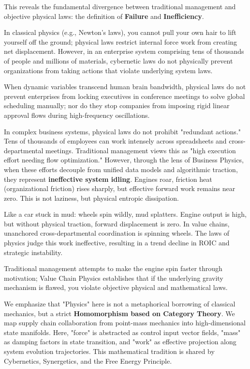 \documentclass[12pt,a4paper,oneside]{book}
\begin{document}
This reveals the fundamental divergence between traditional management and objective physical laws: the definition of \textbf{Failure} and \textbf{Inefficiency}.

In classical physics (e.g., Newton's laws), you cannot pull your own hair to lift yourself off the ground; physical laws restrict internal force work from creating net displacement. However, in an enterprise system comprising tens of thousands of people and millions of materials, cybernetic laws do not physically prevent organizations from taking actions that violate underlying system laws.

When dynamic variables transcend human brain bandwidth, physical laws do not prevent enterprises from locking executives in conference meetings to solve global scheduling manually; nor do they stop companies from imposing rigid linear approval flows during high-frequency oscillations.

In complex business systems, physical laws do not prohibit "redundant actions." Tens of thousands of employees can work intensely across spreadsheets and cross-departmental meetings. Traditional management views this as "high execution effort needing flow optimization." However, through the lens of Business Physics, when these efforts decouple from unified data models and algorithmic traction, they represent \textbf{ineffective system idling}. Engines roar, friction heat (organizational friction) rises sharply, but effective forward work remains near zero. This is not laziness, but physical entropic dissipation.

Like a car stuck in mud: wheels spin wildly, mud splatters. Engine output is high, but without physical traction, forward displacement is zero. In value chains, unanchored cross-departmental coordination is spinning wheels. The laws of physics judge this work ineffective, resulting in a trend decline in ROIC and strategic instability.

Traditional management attempts to make the engine spin faster through motivation; Value Chain Physics establishes that if the underlying gravity mechanism is flawed, you violate objective physical and mathematical laws.

We emphasize that "Physics" here is not a metaphorical borrowing of classical mechanics, but a strict \textbf{Homomorphism based on Category Theory}. We map supply chain collaboration from point-mass mechanics into high-dimensional state manifolds. Here, "force" is abstracted as control input vector fields, "mass" as damping factors in state transition, and "work" as effective projection along system evolution trajectories. This mathematical tradition is shared by Cybernetics, Synergetics, and the Free Energy Principle.
\end{document}
